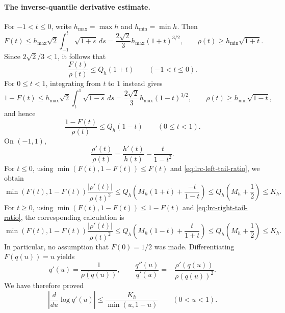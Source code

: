 \documentclass[11pt,a4paper]{article}
\begin{document}
\paragraph{The inverse-quantile derivative estimate.}
For $-1<t\leq0$, write $h_{\max}=\max h$ and $h_{\min}=\min h$.
Then
\[
 F(t)
 \leq h_{\max}\sqrt2\int_{-1}^t\sqrt{1+s}\,ds
 =\frac{2\sqrt2}{3}h_{\max}(1+t)^{3/2},
 \qquad
 \rho(t)\geq h_{\min}\sqrt{1+t}.
\]
Since $2\sqrt2/3<1$, it follows that
\begin{equation}\label{eq:lrc-left-tail-ratio}
 \frac{F(t)}{\rho(t)}\leq Q_h(1+t)
 \qquad(-1<t\leq0).
\end{equation}
For $0\leq t<1$, integrating from $t$ to $1$ instead gives
\[
 1-F(t)
 \leq h_{\max}\sqrt2\int_t^1\sqrt{1-s}\,ds
 =\frac{2\sqrt2}{3}h_{\max}(1-t)^{3/2},
 \qquad \rho(t)\geq h_{\min}\sqrt{1-t},
\]
and hence
\begin{equation}\label{eq:lrc-right-tail-ratio}
 \frac{1-F(t)}{\rho(t)}\leq Q_h(1-t)
 \qquad(0\leq t<1).
\end{equation}
On $(-1,1)$,
\[
 \frac{\rho'(t)}{\rho(t)}
 =\frac{h'(t)}{h(t)}-\frac{t}{1-t^2}.
\]
For $t\leq0$, using $\min(F(t),1-F(t))\leq F(t)$ and
\eqref{eq:lrc-left-tail-ratio}, we obtain
\[
 \min(F(t),1-F(t))\frac{|\rho'(t)|}{\rho(t)^2}
 \leq Q_h\left(M_h(1+t)+\frac{-t}{1-t}\right)
 \leq Q_h\left(M_h+\frac12\right)\leq K_h.
\]
For $t\geq0$, using $\min(F(t),1-F(t))\leq1-F(t)$ and
\eqref{eq:lrc-right-tail-ratio}, the corresponding calculation is
\[
 \min(F(t),1-F(t))\frac{|\rho'(t)|}{\rho(t)^2}
 \leq Q_h\left(M_h(1-t)+\frac{t}{1+t}\right)
 \leq Q_h\left(M_h+\frac12\right)\leq K_h.
\]
In particular, no assumption that $F(0)=1/2$ was made. Differentiating
$F(q(u))=u$ yields
\[
 q'(u)=\frac1{\rho(q(u))},\qquad
 \frac{q''(u)}{q'(u)}
 =-\frac{\rho'(q(u))}{\rho(q(u))^2}.
\]
We have therefore proved
\begin{equation}\label{eq:lrc-log-derivative}
 \left|\frac{d}{du}\log q'(u)\right|
 \leq\frac{K_h}{\min(u,1-u)}\qquad(0<u<1).
\end{equation}
\end{document}
